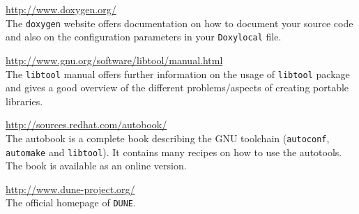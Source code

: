 \documentclass[11pt,a4paper,headinclude,footinclude,DIV16,normalheadings]{scrartcl}
\newcommand{\dune}{\texttt{DUNE}\xspace}
\newcommand{\autoconf}{\texttt{autoconf}\xspace}
\newcommand{\automake}{\texttt{automake}\xspace}
\newcommand{\libtool}{\texttt{libtool}\xspace}
\begin{document}
\url{http://www.doxygen.org/}\\
The \texttt{doxygen} website offers documentation on how to document
your source code and also on the configuration parameters in your
\texttt{Doxylocal} file.

\url{http://www.gnu.org/software/libtool/manual.html}\\
The \libtool manual offers further information on the usage of
\libtool package and gives a good overview of the different
problems/aspects of creating portable libraries.

\url{http://sources.redhat.com/autobook/}\\
The autobook is a complete book describing the GNU toolchain
(\autoconf, \automake and \libtool). It contains many recipes on how
to use the autotools. The book is available as an online 
version.

\url{http://www.dune-project.org/}\\
The official homepage of \dune.
\end{document}

